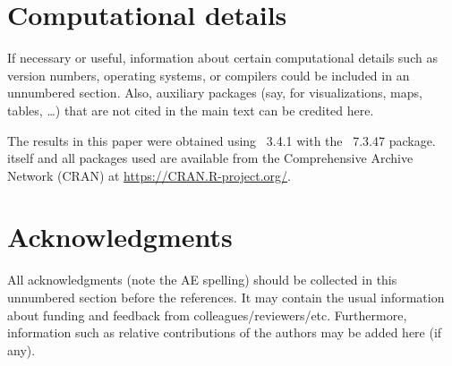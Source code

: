\documentclass[article]{jss}
\begin{document}

\section*{Computational details}

\begin{leftbar}
If necessary or useful, information about certain computational details
such as version numbers, operating systems, or compilers could be included
in an unnumbered section. Also, auxiliary packages (say, for visualizations,
maps, tables, \dots) that are not cited in the main text can be credited here.
\end{leftbar}

The results in this paper were obtained using
~3.4.1 with the
~7.3.47 package.  itself
and all packages used are available from the Comprehensive
 Archive Network (CRAN) at
\url{https://CRAN.R-project.org/}.


\section*{Acknowledgments}

\begin{leftbar}
All acknowledgments (note the AE spelling) should be collected in this
unnumbered section before the references. It may contain the usual information
about funding and feedback from colleagues/reviewers/etc. Furthermore,
information such as relative contributions of the authors may be added here
(if any).
\end{leftbar}







\newpage
\end{document}
